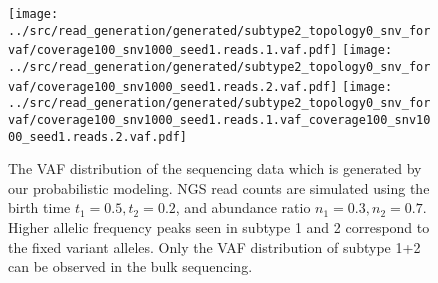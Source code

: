 \documentclass{article}
\begin{document}
\begin{figure}[H]
 \texttt{[image: ../src/read\_generation/generated/subtype2\_topology0\_snv\_forvaf/coverage100\_snv1000\_seed1.reads.1.vaf.pdf]}
 \texttt{[image: ../src/read\_generation/generated/subtype2\_topology0\_snv\_forvaf/coverage100\_snv1000\_seed1.reads.2.vaf.pdf]}
 \texttt{[image: ../src/read\_generation/generated/subtype2\_topology0\_snv\_forvaf/coverage100\_snv1000\_seed1.reads.1.vaf\_coverage100\_snv1000\_seed1.reads.2.vaf.pdf]}
 \caption{The VAF distribution of the sequencing data which is generated by our probabilistic modeling. NGS read counts are simulated using the birth time $t_1=0.5, t_2=0.2$, and abundance ratio $n_1=0.3,  n_2=0.7$. Higher allelic frequency peaks seen in subtype 1 and 2 correspond to the fixed variant alleles. Only the VAF distribution of subtype 1+2 can be observed in the bulk sequencing.}
 \label{VAF_distribution_generated}
\end{figure}
\end{document}
